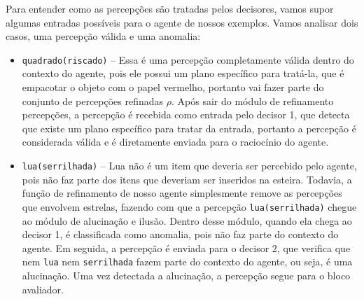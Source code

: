 

\begin{example}
    Para entender como as percepções são tratadas pelos decisores, vamos supor algumas entradas possíveis para o agente de nossos exemplos. Vamos analisar dois casos, uma percepção válida e uma anomalia:
    
    \begin{itemize}
        \item \texttt{quadrado(riscado)} -- Essa é uma percepção completamente válida dentro do contexto do agente, pois ele possui um plano específico para tratá-la, que é empacotar o objeto com o papel vermelho, portanto vai fazer parte do conjunto de percepções refinadas $\rho$. Após sair do módulo de refinamento percepções, a percepção é recebida como entrada pelo decisor 1, que detecta que existe um plano específico para tratar da entrada, portanto a percepção é considerada válida e é diretamente enviada para o raciocínio do agente.
        
        \item \texttt{lua(serrilhada)} --  Lua não é um item que deveria ser percebido pelo agente, pois não faz parte dos itens que deveriam ser inseridos na esteira. Todavia, a função de refinamento de nosso agente simplesmente remove as percepções que envolvem estrelas, fazendo com que a percepção \texttt{lua(serrilhada)} chegue ao módulo de alucinação e ilusão. Dentro desse módulo, quando ela chega ao decisor 1, é classificada como anomalia, pois não faz parte do contexto do agente. Em seguida, a percepção é enviada para o decisor 2, que verifica que nem \texttt{lua} nem \texttt{serrilhada} fazem parte do contexto do agente, ou seja, é uma alucinação. Uma vez detectada a alucinação, a percepção segue para o bloco avaliador.
    \end{itemize}
    \label{example:modulo}

\end{example}{}

